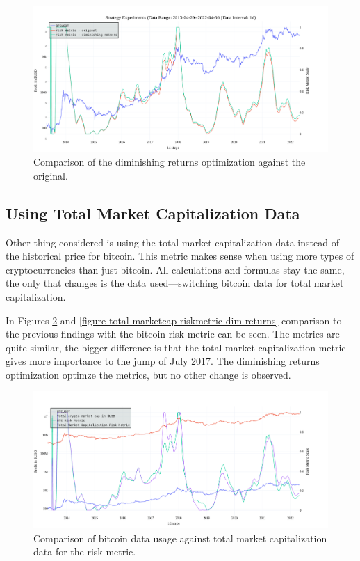 \begin{figure}[!hbt]
    \centering
    \includegraphics[width=\columnwidth]{figures/riskmetric-dim-returns.png}
    \caption{Comparison of the diminishing returns optimization against the original.}
    \label{figure-dim-riskmetric}
\end{figure}

\subsection*{Using Total Market Capitalization Data}
\label{subsection-marketcap}
Other thing considered is using the total market capitalization data instead of the historical price for bitcoin. This metric makes sense when using more types of cryptocurrencies than just bitcoin. All calculations and formulas stay the same, the only that changes is the data used---switching bitcoin data for total market capitalization.

In Figures \ref{figure-total-marketcap-riskmetric} and \ref{figure-total-marketcap-riskmetric-dim-returns} comparison to the previous findings with the bitcoin risk metric can be seen. The metrics are quite similar, the bigger difference is that the total market capitalization metric gives more importance to the jump of July 2017. The diminishing returns optimization optimze the metrics, but no other change is observed.

\begin{figure}[!hbt]
    \centering
    \includegraphics[width=\columnwidth]{figures/totalmarketcap-metric.png}
    \caption{Comparison of bitcoin data usage against total market capitalization data for the risk metric.}
    \label{figure-total-marketcap-riskmetric}
\end{figure}

